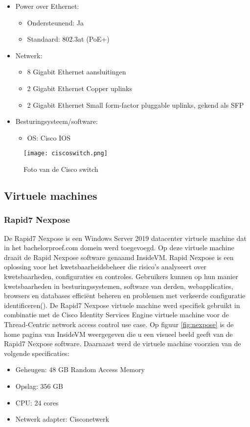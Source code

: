 \begin{itemize}
	\item Power over Ethernet:
	\begin{itemize}
		\item Ondersteunend: Ja
		\item Standaard: 802.3at (PoE+)
	\end{itemize}
	\item Netwerk:
	\begin{itemize}
		\item 8 Gigabit Ethernet aansluitingen
		\item 2 Gigabit Ethernet Copper uplinks
		\item 2 Gigabit Ethernet Small form-factor pluggable uplinks, gekend als SFP
	\end{itemize}
	\item Besturingsysteem/software:
	\begin{itemize}
		\item OS: Cisco IOS
    \end{itemize}
\end{itemize}

\begin{figure}[H]
	\centering
	\texttt{[image: ciscoswitch.png]}
	\caption{Foto van de Cisco switch}
	\label{fig:switch}
\end{figure}
\newpage
\subsection{Virtuele machines}
\subsubsection{Rapid7 Nexpose}
De Rapid7 Nexpose is een Windows Server 2019 datacenter virtuele machine dat in het bachelorproef.com domein werd toegevoegd. Op deze virtuele machine draait de Rapid Nexpose software genaamd InsideVM. Rapid Nexpose is een oplossing voor het kwetsbaarheidsbeheer die risico's analyseert over kwetsbaarheden, configuraties en controles. Gebruikers kunnen op hun manier kwetsbaarheden in besturingssystemen, software van derden, webapplicaties, browsers en databases efficiënt beheren en problemen met verkeerde configuratie identificeren(\cite{Rapid7Li}). De Rapid7 Nexpose virtuele machine werd specifiek gebruikt in combinatie met de Cisco Identity Services Engine virtuele machine voor de Thread-Centric network access control use case. Op figuur \ref{fig:nexpose} is de home pagina van InsideVM weergegeven die u een visueel beeld geeft van de Rapid7 Nexpose software.
\newline\newline
Daarnaast werd de virtuele machine voorzien van de volgende specificaties: 
\begin{itemize}
	\item Geheugen: 48 GB Random Access Memory
	\item Opslag: 356 GB
	\item CPU: 24 cores
	\item Netwerk adapter: Cisco\textunderscore netwerk
\end{itemize}

